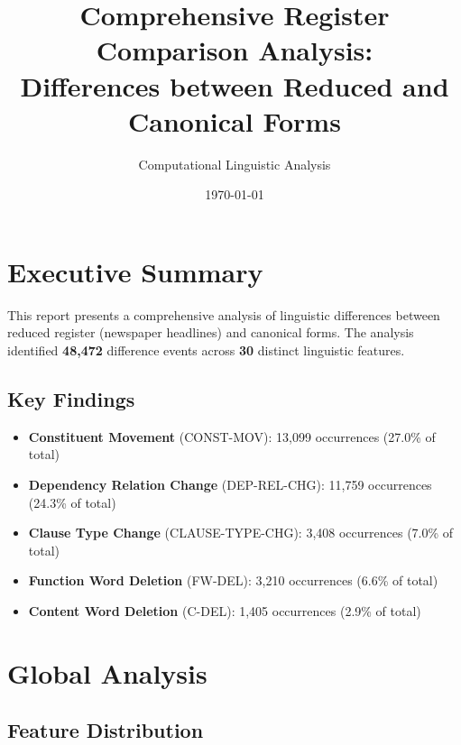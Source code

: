 \documentclass[11pt,a4paper]{article}
\title{Comprehensive Register Comparison Analysis:\\Differences between Reduced and Canonical Forms}
\author{Computational Linguistic Analysis}
\date{\today}
\begin{document}
\maketitle
\tableofcontents
\newpage

\section{Executive Summary}

This report presents a comprehensive analysis of linguistic differences between reduced register (newspaper headlines) and canonical forms. The analysis identified \textbf{48,472} difference events across \textbf{30} distinct linguistic features.

\subsection{Key Findings}
\begin{itemize}
\item \textbf{Constituent Movement} (CONST-MOV): 13,099 occurrences (27.0\% of total)
\item \textbf{Dependency Relation Change} (DEP-REL-CHG): 11,759 occurrences (24.3\% of total)
\item \textbf{Clause Type Change} (CLAUSE-TYPE-CHG): 3,408 occurrences (7.0\% of total)
\item \textbf{Function Word Deletion} (FW-DEL): 3,210 occurrences (6.6\% of total)
\item \textbf{Content Word Deletion} (C-DEL): 1,405 occurrences (2.9\% of total)
\end{itemize}

\section{Global Analysis}

\subsection{Feature Distribution}
\end{document}
